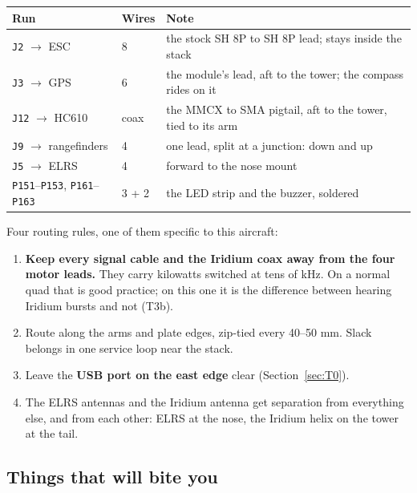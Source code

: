 \documentclass[11pt,a4paper]{article}
\newcommand{\file}[1]{\texttt{\small #1}}
\begin{document}
\begin{center}
\begin{tabular}{@{}lll@{}}
\toprule
\textbf{Run} & \textbf{Wires} & \textbf{Note} \\
\midrule
\file{J2} $\rightarrow$ ESC & 8 & the stock SH 8P to SH 8P lead; stays inside the stack \\
\file{J3} $\rightarrow$ GPS & 6 & the module's lead, aft to the tower; the compass rides on it \\
\file{J12} $\rightarrow$ HC610 & coax & the MMCX to SMA pigtail, aft to the tower, tied to its arm \\
\file{J9} $\rightarrow$ rangefinders & 4 & one lead, split at a junction: down and up \\
\file{J5} $\rightarrow$ ELRS & 4 & forward to the nose mount \\
\file{P151}--\file{P153}, \file{P161}--\file{P163} & 3 + 2 & the LED strip and the buzzer, soldered \\
\bottomrule
\end{tabular}
\end{center}

Four routing rules, one of them specific to this aircraft:
\begin{enumerate}
\item \textbf{Keep every signal cable and the Iridium coax away from the four motor leads.}
They carry kilowatts switched at tens of kHz. On a normal quad that is good practice; on this
one it is the difference between hearing Iridium bursts and not (T3b).
\item Route along the arms and plate edges, zip-tied every 40--50 mm. Slack belongs in one
service loop near the stack.
\item Leave the \textbf{USB port on the east edge} clear (Section~\ref{sec:T0}).
\item The ELRS antennas and the Iridium antenna get separation from everything else, and from
each other: ELRS at the nose, the Iridium helix on the tower at the tail.
\end{enumerate}

\subsection{Things that will bite you}
\end{document}
